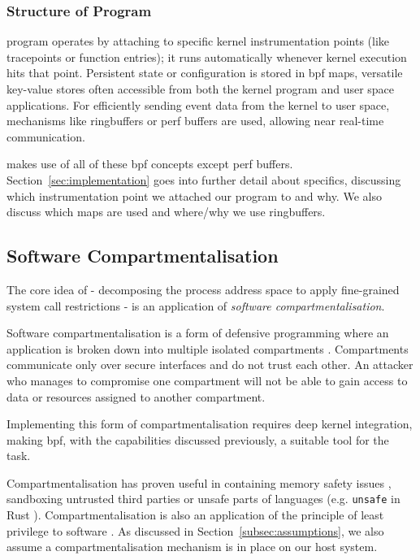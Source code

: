 \subsubsection{Structure of  Program}

 program operates by attaching to specific kernel instrumentation
points (like tracepoints or function entries); it runs automatically
whenever kernel execution hits that point. Persistent state or configuration
is stored in \ac{bpf} maps, versatile key-value stores often accessible from both
the kernel program and user space applications. For efficiently sending
event data from the kernel to user space, mechanisms like ringbuffers or
perf buffers are used, allowing near real-time communication.

\af makes use of all of these \ac{bpf} concepts except perf buffers.
Section~\ref{sec:implementation} goes into further detail about specifics,
discussing which instrumentation point we attached our program to and why. We
also discuss which maps are used and where/why we use ringbuffers.

\subsection{Software Compartmentalisation}

The core idea of \af{}- decomposing the process address space to apply 
fine-grained system call restrictions - is an application of \textit{software
compartmentalisation}.

Software compartmentalisation is a form of defensive programming where an application
is broken down into multiple isolated compartments \cite{SOK}. Compartments
communicate only over secure interfaces and do not trust each other. An
attacker who manages to compromise one compartment will not be able to gain
access to data or resources assigned to another compartment.  

Implementing this form of compartmentalisation requires deep kernel
integration, making \ac{bpf}, with the capabilities discussed previously, a 
suitable tool for the task.  

Compartmentalisation has proven useful in containing memory safety issues
\cite{CONFFUZZ}, sandboxing untrusted third parties \cite{ANDROID_SOK} or
unsafe parts of languages \cite{MPK} (e.g. \texttt{unsafe} in Rust 
\cite{rustbook_unsafe}). Compartmentalisation is also an application of the
principle of least privilege to software \cite{PRIVMAN}. As discussed in 
Section~\ref{subsec:assumptions}, we also assume a compartmentalisation
mechanism is in place on our host system.
